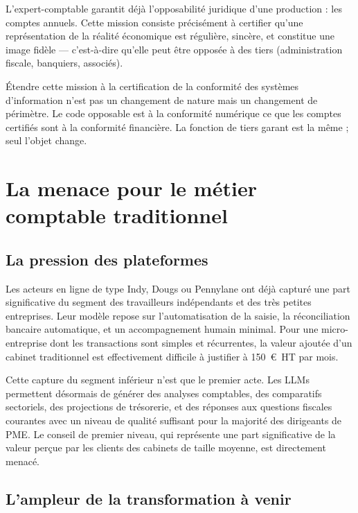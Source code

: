 \documentclass[12pt,a4paper]{article}
\begin{document}
L'expert-comptable garantit déjà l'opposabilité juridique d'une production : les comptes annuels. Cette mission consiste précisément à certifier qu'une représentation de la réalité économique est régulière, sincère, et constitue une image fidèle --- c'est-à-dire qu'elle peut être opposée à des tiers (administration fiscale, banquiers, associés).

Étendre cette mission à la certification de la conformité des systèmes d'information n'est pas un changement de nature mais un changement de périmètre. Le code opposable est à la conformité numérique ce que les comptes certifiés sont à la conformité financière. La fonction de tiers garant est la même ; seul l'objet change.

\section{La menace pour le métier comptable traditionnel}

\subsection{La pression des plateformes}

Les acteurs en ligne de type Indy, Dougs ou Pennylane ont déjà capturé une part significative du segment des travailleurs indépendants et des très petites entreprises. Leur modèle repose sur l'automatisation de la saisie, la réconciliation bancaire automatique, et un accompagnement humain minimal. Pour une micro-entreprise dont les transactions sont simples et récurrentes, la valeur ajoutée d'un cabinet traditionnel est effectivement difficile à justifier à 150~€~HT par mois.

Cette capture du segment inférieur n'est que le premier acte. Les LLMs permettent désormais de générer des analyses comptables, des comparatifs sectoriels, des projections de trésorerie, et des réponses aux questions fiscales courantes avec un niveau de qualité suffisant pour la majorité des dirigeants de PME. Le conseil de premier niveau, qui représente une part significative de la valeur perçue par les clients des cabinets de taille moyenne, est directement menacé.

\subsection{L'ampleur de la transformation à venir}
\end{document}
